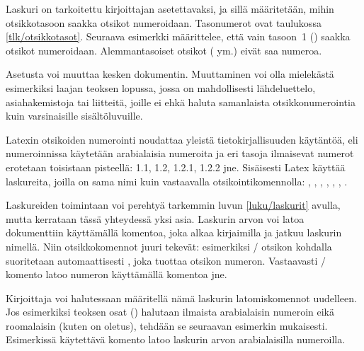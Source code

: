 Laskuri  on tarkoitettu kirjoittajan
asetettavaksi, ja sillä määritetään, mihin otsikkotasoon saakka otsikot
numeroidaan. Tasonumerot ovat taulukossa \ref{tlk/otsikkotasot}.
Seuraava esimerkki määrittelee, että vain tasoon~1 ()
saakka otsikot numeroidaan. Alemmantasoiset otsikot
( ym.) eivät saa numeroa.

\begin{koodilohkosis}
\setcounter{secnumdepth}{1}
\end{koodilohkosis}

\noindent
Asetusta voi muuttaa kesken dokumentin. Muuttaminen voi olla mielekästä
esimerkiksi laajan teoksen lopussa, jossa on mahdollisesti
lähdeluettelo, asiahakemistoja tai liitteitä, joille ei ehkä haluta
samanlaista otsikkonumerointia kuin varsinaisille sisältöluvuille.

Latexin otsikoiden numerointi noudattaa yleistä tietokirjallisuuden
käytäntöä, eli numeroinnissa käytetään arabialaisia numeroita ja eri
tasoja ilmaisevat numerot erotetaan toisistaan pisteellä: 1.1, 1.2,
1.2.1, 1.2.2 jne. Sisäisesti Latex käyttää laskureita, joilla on sama
nimi kuin vastaavalla otsikointikomennolla: ,
, , ,
, , .

Laskureiden toimintaan voi perehtyä tarkemmin luvun \ref{luku/laskurit}
avulla, mutta kerrataan tässä yhteydessä yksi asia. Laskurin arvon voi
latoa dokumenttiin käyttämällä komentoa, joka alkaa kirjaimilla
 ja jatkuu laskurin nimellä. Niin otsikkokomennot juuri
tekevät: esimerkiksi \-/ otsikon kohdalla suoritetaan
automaattisesti , joka tuottaa otsikon numeron.
Vastaavasti \-/ komento latoo numeron käyttämällä
komentoa  jne.

Kirjoittaja voi halutessaan määritellä nämä laskurin latomiskomennot
uudelleen. Jos esimerkiksi teoksen osat () halutaan
ilmaista arabialaisin numeroin eikä roomalaisin (kuten on oletus),
tehdään se seuraavan esimerkin mukaisesti. Esimerkissä käytettävä
komento  latoo laskurin arvon arabialaisilla numeroilla.

\begin{koodilohkosis}
\renewcommand{\thepart}{\arabic{part}}
\end{koodilohkosis}


